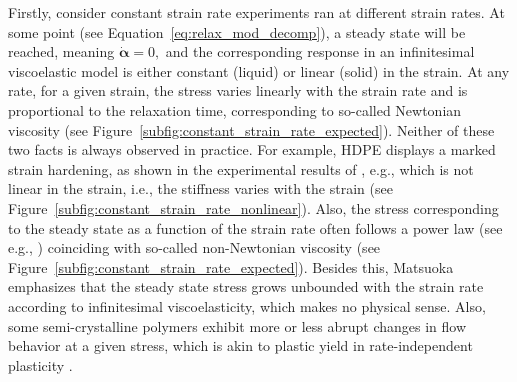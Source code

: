 Firstly, consider constant strain rate experiments ran at different strain rates.
At some point (see Equation~\eqref{eq:relax_mod_decomp}), a steady state will be reached, meaning $\dot {\bm\alpha} = 0,$ and the corresponding response in an infinitesimal viscoelastic model is either constant (liquid) or linear (solid) in the strain.
At any rate, for a given strain, the stress varies linearly with the strain rate and is proportional to the relaxation time, corresponding to so-called Newtonian viscosity \citep{matsuokaThermodynamicTheoryViscoelasticity1996} (see Figure~\ref{subfig:constant_strain_rate_expected}).
Neither of these two facts is always observed in practice.
For example, HDPE displays a marked strain hardening, as shown in the experimental results of \cite{gsellYieldTransientEffects1981}, e.g., which is not linear in the strain, i.e., the stiffness varies with the strain (see Figure~\ref{subfig:constant_strain_rate_nonlinear}).
Also, the stress corresponding to the steady state as a function of the strain rate often follows a power law (see e.g.,  \cite{gsellDeterminationPlasticBehaviour1979}) coinciding with so-called non-Newtonian viscosity (see Figure~\ref{subfig:constant_strain_rate_expected}).
Besides this, Matsuoka \citep{matsuokaThermodynamicTheoryViscoelasticity1996} emphasizes that the steady state stress grows unbounded with the strain rate according to infinitesimal viscoelasticity, which makes no physical sense.
Also, some semi-crystalline polymers exhibit more or less abrupt changes in flow behavior at a given stress, which is akin to plastic yield in rate-independent plasticity \citep{bergstromMechanicsSolidPolymers2015}.
